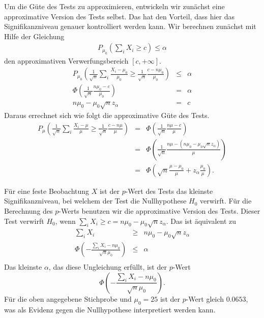 Um die Güte des Tests zu approximieren, entwickeln wir zunächst eine approximative 
Version des Tests selbst. Das hat den Vorteil, dass hier das Signifikanzniveau 
genauer kontrolliert werden kann. Wir berechnen zunächst mit Hilfe der Gleichung
\begin{eqnarray*}
    P_{\mu_0} \left( \sum_{i}^{} X_i \geq c \right) \leq \alpha
\end{eqnarray*}
den approximativen Verwerfungsbereich $\left[ c,+\infty \right]$.
\begin{eqnarray*}
    P_{\mu_0} \left( \frac{1}{\sqrt{n}} \sum_{i}^{} \frac{X_i - \mu_0}{\mu_0} \geq \frac{1}{\sqrt{n}} 
    \frac{c -n\mu_0}{ \mu_0}\right) &\leq& \alpha \\
    \Phi \left( \frac{1}{\sqrt{n} } \frac{n \mu_0 - c}{\mu_0}  \right) &=&  \alpha \\
    n \mu_0 - \mu_0 \sqrt{n} z_\alpha &=&  c
\end{eqnarray*}
Daraus errechnet sich wie folgt die approximative Güte des Tests.
\begin{eqnarray*}
    P_\mu \left( \frac{1}{\sqrt{n}} \sum_{i}^{} \frac{X_i - \mu}{\mu} \geq \frac{1}{\sqrt{n}} \frac{c-n \mu}{ \mu}   \right) &=&  \Phi \left( \frac{1}{\sqrt{n}} \frac{n \mu - c}{ \mu} \right) \\
    &=& \Phi \left( \frac{1}{\sqrt{n}} \frac{n \mu - \left( n \mu_0 -\mu_0 \sqrt{n} z_\alpha \right)}{\mu} \right) \\
    &=& \Phi \left( \sqrt{n} \frac{\mu - \mu_0}{\mu} + z_\alpha \frac{\mu_0}{\mu} \right).
\end{eqnarray*}

Für eine feste Beobachtung $X$ ist der $p$-Wert des Tests das kleinste Signifikanzniveau, 
bei welchem der Test die Nullhypothese $H_0$ verwirft. Für die Berechnung des $p$-Werts
benutzen wir die approximative Version des Tests. Dieser Test verwirft $H_0$, wenn
$\sum_{i}^{} X_i \geq c = n \mu_0 - \mu_0 \sqrt{n} z_\alpha$. Das ist äquivalent zu
\begin{eqnarray*}
    \sum_{i}^{} X_i &\geq & n \mu_0 - \mu_0 \sqrt{n} z_\alpha \\ 
    \Phi \left(  - \frac{ \sum_{i}^{} X_i -n \mu_0   }{\sqrt{n} \mu_0} \right) &\leq& \alpha \\
\end{eqnarray*}
Das kleinste $\alpha$, das diese Ungleichung erfüllt, ist der $p$-Wert
\begin{equation*}
    \Phi \left(  - \frac{ \sum_{i}^{} X_i -n \mu_0   }{\sqrt{n} \mu_0} \right).
\end{equation*}
Für die oben angegebene Stichprobe und $\mu_0=25$ ist der $p$-Wert gleich $0.0653$, was als
Evidenz gegen die Nullhypothese interpretiert werden kann.


